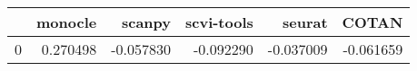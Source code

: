 \begin{tabular}{lrrrrr}
\toprule
 & monocle & scanpy & scvi-tools & seurat & COTAN \\
\midrule
0 & 0.270498 & -0.057830 & -0.092290 & -0.037009 & -0.061659 \\
\bottomrule
\end{tabular}
